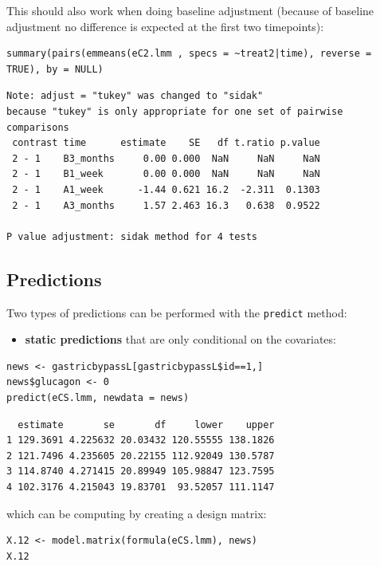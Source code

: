 \documentclass[12pt]{article}
\begin{document}
This should also work when doing baseline adjustment (because of
baseline adjustment no difference is expected at the first two
timepoints):
\lstset{language=r,label= ,caption= ,captionpos=b,numbers=none}
\begin{lstlisting}
summary(pairs(emmeans(eC2.lmm , specs = ~treat2|time), reverse = TRUE), by = NULL)
\end{lstlisting}

\begin{verbatim}
Note: adjust = "tukey" was changed to "sidak"
because "tukey" is only appropriate for one set of pairwise comparisons
 contrast time      estimate    SE   df t.ratio p.value
 2 - 1    B3_months     0.00 0.000  NaN     NaN     NaN
 2 - 1    B1_week       0.00 0.000  NaN     NaN     NaN
 2 - 1    A1_week      -1.44 0.621 16.2  -2.311  0.1303
 2 - 1    A3_months     1.57 2.463 16.3   0.638  0.9522

P value adjustment: sidak method for 4 tests
\end{verbatim}

\subsection{Predictions}
\label{sec:org2fddca8}

Two types of predictions can be performed with the \texttt{predict} method:
\begin{itemize}
\item \textbf{static predictions} that are only conditional on the covariates:
\end{itemize}
\lstset{language=r,label= ,caption= ,captionpos=b,numbers=none}
\begin{lstlisting}
news <- gastricbypassL[gastricbypassL$id==1,]
news$glucagon <- 0
predict(eCS.lmm, newdata = news)
\end{lstlisting}

\begin{verbatim}
  estimate       se       df     lower    upper
1 129.3691 4.225632 20.03432 120.55555 138.1826
2 121.7496 4.235605 20.22155 112.92049 130.5787
3 114.8740 4.271415 20.89949 105.98847 123.7595
4 102.3176 4.215043 19.83701  93.52057 111.1147
\end{verbatim}


which can be computing by creating a design matrix:
\lstset{language=r,label= ,caption= ,captionpos=b,numbers=none}
\begin{lstlisting}
X.12 <- model.matrix(formula(eCS.lmm), news)
X.12
\end{lstlisting}
\end{document}
